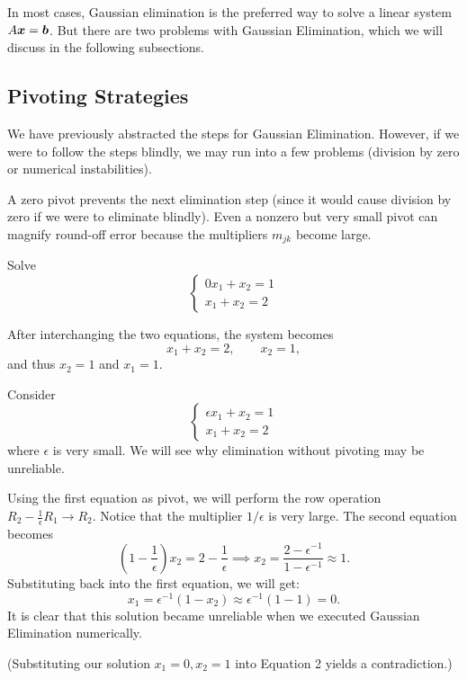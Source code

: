 In most cases, Gaussian elimination is the preferred way to solve a linear system $A\boldsymbol{x}=\boldsymbol{b}$. But there are two problems with Gaussian Elimination, which we will discuss in the following subsections.

\subsection{Pivoting Strategies}

We have previously abstracted the steps for Gaussian Elimination. However, if we were to follow the steps blindly, we may run into a few problems (division by zero or numerical instabilities).

A zero pivot prevents the next elimination step (since it would cause division by zero if we were to eliminate blindly).  Even a nonzero but very small pivot can magnify round-off error because the multipliers $m_{jk}$ become large.

\begin{example}
Solve
\[
\begin{cases}
 0x_1+x_2=1 \\
 x_1+x_2=2
\end{cases}
\]
\end{example}

\begin{solution}[2.4cm]
After interchanging the two equations, the system becomes
\[
 x_1+x_2=2,
 \qquad x_2=1,
\]
and thus $x_2=1$ and $x_1=1$.
\end{solution}

\begin{example}
Consider
\[
\begin{cases}
 \epsilon x_1+x_2=1\\
 x_1+x_2=2
\end{cases}
\]
where $\epsilon$ is very small.  We will see why elimination without pivoting may be unreliable.
\end{example}

\begin{solution}[3.0cm]
Using the first equation as pivot, we will perform the row operation $\displaystyle R_2-\frac{1}{\epsilon}R_1\to R_2$. Notice that the multiplier $1/\epsilon$ is very large.  The second equation becomes
\[
 \left(1-\frac1\epsilon\right)x_2
 =2-\frac1\epsilon
 \implies
 x_2 = \frac{2-\epsilon^{-1}}{1-\epsilon^{-1}}\approx 1.
\]
Substituting back into the first equation, we will get:
\[
    x_1 = \epsilon^{-1}(1-x_2) \approx \epsilon^{-1}(1-1) = 0.
\]
It is clear that this solution became unreliable when we executed Gaussian Elimination numerically. 

\noindent
(Substituting our solution $x_1 = 0, x_2 = 1$ into Equation 2 yields a contradiction.)
\end{solution}

